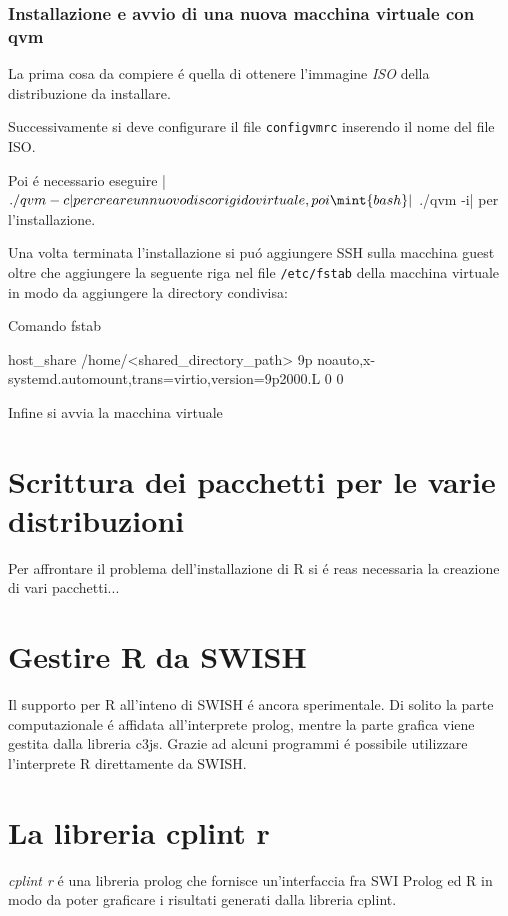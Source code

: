 \documentclass[10pt,titlepage,twoside,a4paper]{report}
\newenvironment{code}{\singlespacing\captionsetup{type=listing}}{}
\begin{document}
\subsection{Installazione e avvio di una nuova macchina virtuale con qvm}
La prima cosa da compiere \'e quella di ottenere l'immagine \emph{ISO} della 
distribuzione da installare.

Successivamente si deve configurare il file \texttt{configvmrc} inserendo il 
nome del file ISO.

Poi \'e necessario eseguire |$ ./qvm -c| per creare un nuovo 
disco rigido virtuale, poi \mint{bash}|$ ./qvm -i| per l'installazione.

Una volta terminata l'installazione si pu\'o aggiungere SSH sulla macchina 
guest oltre che aggiungere la seguente riga nel file \texttt{/etc/fstab} della 
macchina virtuale in modo da aggiungere la directory condivisa:

\begin{code}
    \caption{Comando fstab}
    \begin{textcode*}{}
host_share /home/<shared_directory_path> 9p noauto,x-systemd.automount,trans=virtio,version=9p2000.L 0 0
    \end{textcode*}
\end{code}

Infine si avvia la macchina virtuale

\chapter{Scrittura dei pacchetti per le varie distribuzioni} \label{Scrittura 
dei pacchetti per le varie distribuzioni}
Per affrontare il problema dell'installazione di R si \'e reas necessaria la 
creazione di vari pacchetti...

\chapter{Gestire R da SWISH}
Il supporto per R all'inteno di SWISH \'e ancora sperimentale. Di solito 
la parte computazionale \'e affidata all'interprete prolog, mentre la parte 
grafica viene gestita dalla libreria c3js. Grazie ad alcuni programmi \'e 
possibile utilizzare l'interprete R direttamente da SWISH.

\chapter{La libreria cplint r} \label{La libreria cplint r}
\emph{cplint r} \'e una libreria prolog che fornisce un'interfaccia fra SWI 
Prolog ed R in modo da poter graficare i risultati generati dalla libreria 
cplint.
\end{document}
